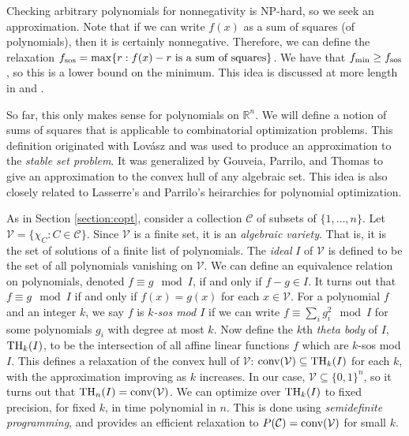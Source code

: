 Checking arbitrary polynomials for nonnegativity is NP-hard, so we seek an approximation.
Note that if we can write $f(x)$ as a sum of squares (of polynomials), then it is certainly nonnegative. 
Therefore, we can define the relaxation $f_{\textup{sos}} = \max \{r: f(x) - r \textup{ is a sum of squares}\}$.
We have that $f_{\min} \ge f_{\textup{sos}}$, so this is a lower bound on the minimum. 
This idea is discussed at more length in \cite{sostools} and \cite{lasserre}. 

So far, this only makes sense for polynomials on $\mathbb{R}^n$.
We will define a notion of sums of squares that is applicable to combinatorial optimization problems.
This definition originated with Lov\'asz \cite{lovasz} and was used to produce an approximation to the {\em stable set problem}.
It was generalized by Gouveia, Parrilo, and Thomas \cite{gpt} to give an approximation to the convex hull of any algebraic set.
This idea is also closely related to Lasserre's \cite{lasserre} and Parrilo's \cite{parrilo} heirarchies for polynomial optimization.

As in Section \ref{section:copt}, consider a collection $\mathcal{C}$ of subsets of $\{1, \ldots, n\}$. 
Let $\mathcal{V} = \{\chi_C: C \in \mathcal{C}\}$.
Since $\mathcal{V}$ is a finite set, it is an {\em algebraic variety}.
That is, it is the set of solutions of a finite list of polynomials.
The {\em ideal} $I$ of $\mathcal{V}$ is defined to be the set of all polynomials vanishing on $\mathcal{V}$.
We can define an equivalence relation on polynomials, denoted $f \equiv g \mod I$, if and only if $f - g \in I$.
It turns out that $f \equiv g \mod I$ if and only if $f(x) = g(x)$ for each $x \in \mathcal{V}$.
For a polynomial $f$ and an integer $k$, we say $f$ is {\em $k$-sos mod $I$} if we can write $f \equiv \sum_i g_i^2 \mod I$ for some polynomials $g_i$ with degree at most $k$.
Now define the $k$th {\em theta body} of $I$, $\textup{TH}_k(I)$, to be the intersection of all affine linear functions $f$ which are $k$-sos mod $I$. 
This defines a relaxation of the convex hull of $\mathcal{V}$: $\hbox{conv}(\mathcal{V}) \subseteq \textup{TH}_k(I)$ for each $k$, with the approximation improving as $k$ increases.
In our case, $\mathcal{V} \subseteq \{0,1\}^n$, so it turns out that $\textup{TH}_n(I) =  \hbox{conv}(\mathcal{V})$.
We can optimize over $\textup{TH}_k(I)$ to fixed precision, for fixed $k$,  in time polynomial in $n$.
This is done using {\em semidefinite programming}, and provides an efficient relaxation to $P(\mathcal{C}) = \hbox{conv}(\mathcal{V})$ for small $k$.

